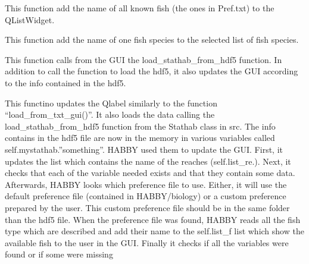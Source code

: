 \documentclass[letterpaper,10pt,english]{sphinxmanual}
\begin{document}
\begin{fulllineitems}
\begin{fulllineitems}
\label{\detokenize{index:src_GUI.stathab_GUI.StathabW.add_all_fish}}
This function add the name of all known fish (the ones in Pref.txt) to the QListWidget.

\end{fulllineitems}


\begin{fulllineitems}
\label{\detokenize{index:src_GUI.stathab_GUI.StathabW.add_fish}}
This function add the name of one fish species to the selected list of fish species.

\end{fulllineitems}


\begin{fulllineitems}
\label{\detokenize{index:src_GUI.stathab_GUI.StathabW.init_iu}}
\end{fulllineitems}


\begin{fulllineitems}
\label{\detokenize{index:src_GUI.stathab_GUI.StathabW.load_from_hdf5_gui}}
This function calls from the GUI the load\_stathab\_from\_hdf5 function. In addition to call the function to load
the hdf5, it also updates the GUI according to the info contained in the hdf5.


This functino updates the Qlabel similarly to the function “load\_from\_txt\_gui()”.
It also loads the data calling the load\_stathab\_from\_hdf5 function from the Stathab class in src. The info
contains in the hdf5 file are now in the memory in various variables called self.mystathab.”something”.
HABBY used them to update the GUI. First, it updates the list which contains the name of the reaches
(self.list\_re.). Next, it checks that each of the variable needed exists and that they contain some data.
Afterwards, HABBY looks which preference file to use. Either, it will use the default preference file
(contained in HABBY/biology) or a custom preference prepared by the user. This custom preference
file should be in the same folder than the hdf5 file. When the preference file was found, HABBY reads all
the fish type which are described and add their name to the self.list\_f list which show the available fish
to the user in the GUI. Finally it checks if all the variables were found or if some were missing


\end{fulllineitems}
\end{fulllineitems}
\end{document}
